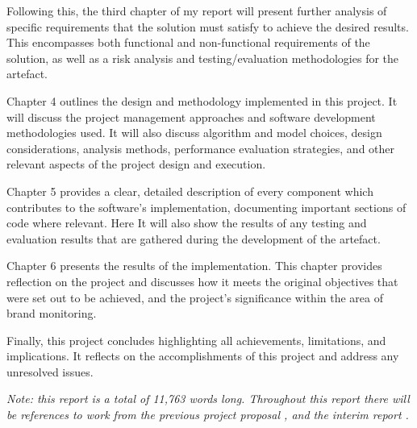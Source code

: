 Following this, the third chapter of my report will present further analysis of specific requirements that the solution must satisfy to achieve the desired results. This encompasses both functional and non-functional requirements of the solution, as well as a risk analysis and testing/evaluation methodologies for the artefact.

Chapter 4 outlines the design and methodology implemented in this project. It will discuss the project management approaches and software development methodologies used. It will also discuss algorithm and model choices, design considerations, analysis methods, performance evaluation strategies, and other relevant aspects of the project design and execution.

Chapter 5 provides a clear, detailed description of every component which contributes to the software's implementation, documenting important sections of code where relevant. Here It will also show the results of any testing and evaluation results that are gathered during the development of the artefact.

Chapter 6 presents the results of the implementation. This chapter provides reflection on the project and discusses how it meets the original objectives that were set out to be achieved, and the project's significance within the area of brand monitoring.

Finally, this project concludes highlighting all achievements, limitations, and implications. It reflects on the accomplishments of this project and address any unresolved issues.

\textit{Note: this report is a total of 11,763 words long. Throughout this report there will be references to work from the previous project proposal \citep{atkinson2023proposal}, and the interim report \citep{atkinson2024interim}.}